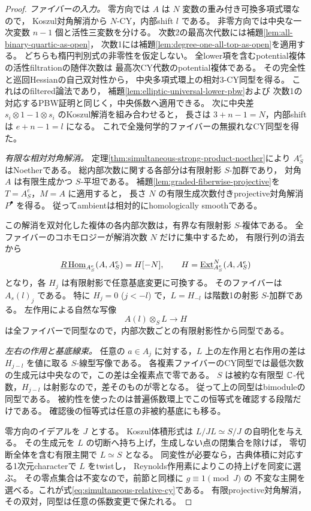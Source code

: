 \begin{proof}
\emph{ファイバーの入力。}
零方向では $A$ は $N$ 変数の重み付き可換多項式環なので，
Koszul対角解消から $N$-CY，内部shift $l$ である。
非零方向では中央な一次変数 $n-1$ 個と活性三変数を分ける。
次数2の最高次代数には補題\ref{lem:all-binary-quartic-as-open}，
次数1には補題\ref{lem:degree-one-all-top-as-open}を適用する。
どちらも楕円判別式の非零性を仮定しない。
全lower項を含むpotential複体の活性filtrationの随伴次数は
最高次CY代数のpotential複体である。
その完全性と巡回Hessianの自己双対性から，
中央多項式環上の相対3-CY同型を得る。
これは\cite[Proposition~7.3.1(ii)]{EG2010}のfiltered論法であり，
補題\ref{lem:elliptic-universal-lower-pbw}および
次数1の対応するPBW証明と同じく，中央係数へ適用できる。
次に中央差 $s_i\otimes1-1\otimes s_i$ のKoszul解消を組み合わせると，
長さは $3+n-1=N$，内部shiftは $e+n-1=l$ になる。
これで全幾何学的ファイバーの無捩れなCY同型を得た。

\emph{有限な相対対角解消。}
定理\ref{thm:simultaneous-strong-product-noether}により $A^e_S$ はNoetherである。
総内部次数に関する各部分は有限射影 $S$-加群であり，
対角 $A$ は有限生成かつ $S$-平坦である。
補題\ref{lem:graded-fiberwise-projective}を $T=A^e_S$，$M=A$ に適用すると，
長さ $N$ の有限生成次数付きprojective対角解消 $P^\bullet$ を得る。
従ってambientは相対的にhomologically smoothである。

この解消を双対化した複体の各内部次数は，有界な有限射影 $S$-複体である。
全ファイバーのコホモロジーが解消次数 $N$ だけに集中するため，
有限行列の消去から
\[
 \underline{R\operatorname{Hom}}_{A^e_S}(A,A^e_S)=H[-N],
 \qquad H=\underline{\operatorname{Ext}}^{N}_{A^e_S}(A,A^e_S)
\]
となり，各 $H_j$ は有限射影で任意基底変更に可換する。
そのファイバーは $A_s(l)_j$ である。
特に $H_j=0$ ($j<-l$) で，$L=H_{-l}$ は階数1の射影 $S$-加群である。
左作用による自然な写像
\[
 A(l)\otimes_S L\longrightarrow H
\]
は全ファイバーで同型なので，内部次数ごとの有限射影性から同型である。

\emph{左右の作用と基底線束。}
任意の $a\in A_j$ に対する，$L$ 上の左作用と右作用の差は
$H_{j-l}$ を値に取る $S$-線型写像である。
各複素ファイバーのCY同型では最低次数の生成元は中央なので，この差は全複素点で零である。
$S$ は被約な有限型 $\mathbb C$-代数，$H_{j-l}$ は射影なので，差そのものが零となる。
従って上の同型はbimoduleの同型である。
被約性を使ったのは普遍係数環上でこの恒等式を確認する段階だけである。
確認後の恒等式は任意の非被約基底にも移る。

零方向のイデアルを $J$ とする。
Koszul体積形式は $L/JL\simeq S/J$ の自明化を与える。
その生成元を $L$ の切断へ持ち上げ，生成しない点の閉集合を除けば，
零切断全体を含む有限主開で $L\simeq S$ となる。
同変性が必要なら，古典体積に対応する1次元characterで $L$ をtwistし，
Reynolds作用素によりこの持上げを同変に選ぶ。
その零点集合は不変なので，前節と同様に $g\equiv1\pmod J$ の
不変な主開を選べる。これが式\eqref{eq:simultaneous-relative-cy}である。
有限projective対角解消，その双対，同型は任意の係数変更で保たれる。
\end{proof}

